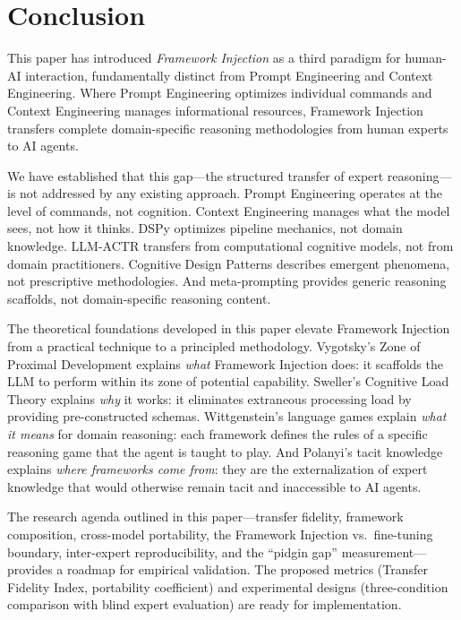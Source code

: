 \documentclass[12pt,a4paper]{article}
\begin{document}
\section{Conclusion}
\label{sec:conclusion}

This paper has introduced \emph{Framework Injection} as a third paradigm for human-AI interaction, fundamentally distinct from Prompt Engineering and Context Engineering. Where Prompt Engineering optimizes individual commands and Context Engineering manages informational resources, Framework Injection transfers complete domain-specific reasoning methodologies from human experts to AI agents.

We have established that this gap---the structured transfer of expert reasoning---is not addressed by any existing approach. Prompt Engineering operates at the level of commands, not cognition. Context Engineering manages what the model sees, not how it thinks. DSPy optimizes pipeline mechanics, not domain knowledge. LLM-ACTR transfers from computational cognitive models, not from domain practitioners. Cognitive Design Patterns describes emergent phenomena, not prescriptive methodologies. And meta-prompting provides generic reasoning scaffolds, not domain-specific reasoning content.

The theoretical foundations developed in this paper elevate Framework Injection from a practical technique to a principled methodology. Vygotsky's Zone of Proximal Development explains \emph{what} Framework Injection does: it scaffolds the LLM to perform within its zone of potential capability. Sweller's Cognitive Load Theory explains \emph{why} it works: it eliminates extraneous processing load by providing pre-constructed schemas. Wittgenstein's language games explain \emph{what it means} for domain reasoning: each framework defines the rules of a specific reasoning game that the agent is taught to play. And Polanyi's tacit knowledge explains \emph{where frameworks come from}: they are the externalization of expert knowledge that would otherwise remain tacit and inaccessible to AI agents.

The research agenda outlined in this paper---transfer fidelity, framework composition, cross-model portability, the Framework Injection vs.\ fine-tuning boundary, inter-expert reproducibility, and the ``pidgin gap'' measurement---provides a roadmap for empirical validation. The proposed metrics (Transfer Fidelity Index, portability coefficient) and experimental designs (three-condition comparison with blind expert evaluation) are ready for implementation.
\end{document}
